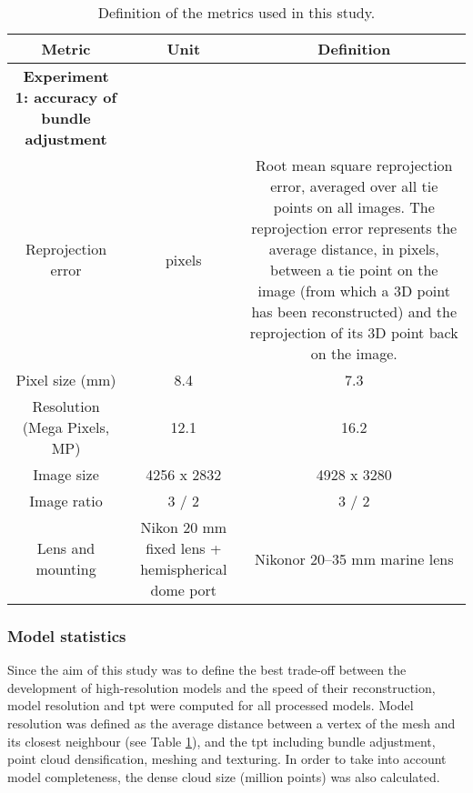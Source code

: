 \begin{table}[H]
    \caption{Definition of the metrics used in this study.}\label{tab1.2}
    \centering
    \begin{tabular}{ccc}
    \toprule
    \textbf{Metric}	& \textbf{Unit}	& \textbf{Definition}\\
    \midrule
    \textbf{Experiment 1: accuracy of bundle adjustment}		& 			& \\
    Reprojection error		& pixels			& Root mean square reprojection error, averaged over all tie points on all images. The reprojection error represents the average distance, in pixels, between a tie point on the image (from which a 3D point has been reconstructed) and the reprojection of its 3D
    point back on the image.\\
    Pixel size (mm)     & 8.4       & 7.3\\
    Resolution (Mega Pixels, MP)		& 12.1			& 16.2\\
    Image size		& 4256 x 2832			& 4928 x 3280\\
    Image ratio		& 3 / 2			& 3 / 2\\
    Lens and mounting		& Nikon 20 mm fixed lens + hemispherical
    dome port			& Nikonor 20–35 mm marine lens\\
    \bottomrule
    \end{tabular}
\end{table}

\subsubsection{Model statistics}\label{chapitre1_2.3.2}
Since the aim of this study was to define the best trade-off between the development of high-resolution models and the speed of their reconstruction, model resolution and \gls{tpt} were computed for all processed models. Model resolution was defined as the average distance between a vertex of the mesh and its closest neighbour (see Table \ref{tab1.2}), and the \acrshort{tpt} including bundle adjustment, point cloud densification, meshing and texturing. In order to take into account model completeness, the dense cloud size (million points) was also calculated.

